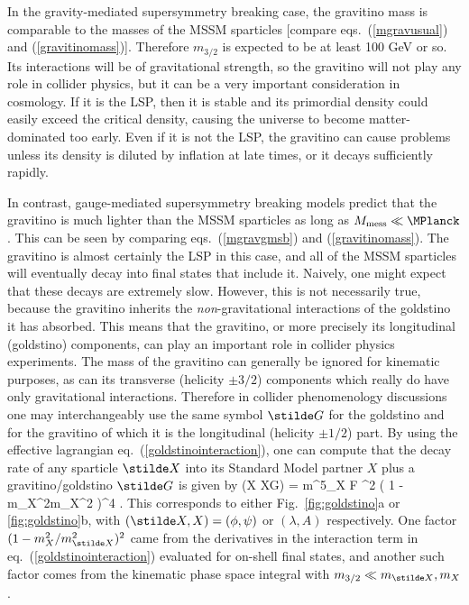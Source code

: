In the gravity-mediated supersymmetry breaking case, the gravitino
mass is comparable to the masses of the MSSM sparticles [compare
eqs.~(\ref{mgravusual}) and (\ref{gravitinomass})]. Therefore $m_{3/2}$
is expected to be at least 100 GeV or so. Its interactions will be of
gravitational strength, so the gravitino will not play any role in
collider physics, but it can be a very important consideration in
cosmology.\cite{cosmogravitino}
If it is the LSP, then it is stable and its
primordial density could easily exceed the critical density,
causing the universe to become matter-dominated too early. Even
if it is not the LSP, the gravitino can cause problems
unless its
density is diluted by inflation at late times, or it decays sufficiently
rapidly.

In contrast, gauge-mediated supersymmetry breaking models predict that the
gravitino
is much lighter than the MSSM sparticles as long as $M_{\rm mess} \ll
\MPlanck$. This can be seen
by comparing eqs.~(\ref{mgravgmsb}) and (\ref{gravitinomass}).
The gravitino is almost certainly the LSP in this case, and all of the
MSSM sparticles will eventually decay into final states that include it.
Naively, one might expect that these decays are extremely slow.
However, this is not necessarily true, because the gravitino
inherits the {\it non}-gravitational interactions of the goldstino
it has absorbed.
This means that the gravitino, or more precisely its longitudinal
(goldstino)
components, can play an important role in collider physics experiments.
The mass of the gravitino can generally be ignored for kinematic
purposes,
as can its transverse (helicity $\pm 3/2$) components which
really do have
only
gravitational interactions. Therefore in collider phenomenology
discussions one may
interchangeably use the same
symbol
$\stilde G$ for the goldstino and for the gravitino of which it is
the longitudinal (helicity $\pm 1/2$) part.
By using
the effective lagrangian eq.~(\ref{goldstinointeraction}),
one can compute that the decay rate of any sparticle $\stilde X$ into
its Standard Model partner $X$ plus a gravitino/goldstino $\stilde G$
is given by
\beq
\Gamma(\stilde X \rightarrow X\stilde G) =
{m^5_{\stilde X}  \pi \langle F \rangle^2}
\left ( 1 - {m_X^2\over m_{\stilde X}^2} \right )^4 .
\qquad\>\>{}
\label{generalgravdecay}
\eeq
This corresponds to either Fig.~\ref{fig:goldstino}a or
\ref{fig:goldstino}b,
with $(\stilde X,X) = (\phi,\psi)$ or $(\lambda,A)$ respectively.
One factor $(1 - m_X^2/m_{\stilde X}^2 )^2$ came from the derivatives
in the interaction term in eq.~(\ref{goldstinointeraction}) evaluated for
on-shell final states,
and another such factor comes from
the kinematic phase space integral with $m_{3/2} \ll m_{\stilde X}, m_X$.


